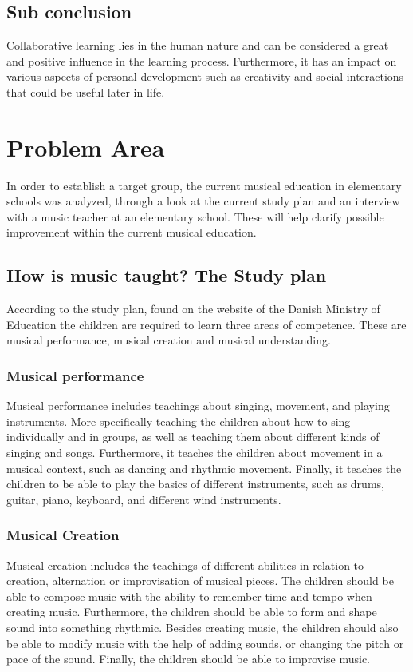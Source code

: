 \subsection*{Sub conclusion}
Collaborative learning lies in the human nature and can be considered a great and positive influence in the learning process. Furthermore, it has an impact on various aspects of personal development such as creativity and social interactions that could be useful later in life.

\newpage \section{Problem Area}\label{sec:problemArea}
In order to establish a target group, the current musical education in elementary schools was analyzed, through a look at the current study plan and an interview with a music teacher at an elementary school. These will help clarify possible improvement within the current musical education.

\subsection{How is music taught? The Study plan}\label{studyPlan}
According to the study plan, found on the website of the Danish Ministry of Education the children are required to learn three areas of competence. These are musical performance, musical creation and musical understanding\cite{studyPlan}.

\subsubsection*{Musical performance}
Musical performance includes teachings about singing, movement, and playing instruments. More specifically teaching the children about how to sing individually and in groups, as well as teaching them about different kinds of singing and songs. Furthermore, it teaches the children about movement in a musical context, such as dancing and rhythmic movement. Finally, it teaches the children to be able to play the basics of different instruments, such as drums, guitar, piano, keyboard, and different wind instruments\cite{studyPlan}.

\subsubsection*{Musical Creation}
Musical creation includes the teachings of different abilities in relation to creation, alternation or improvisation of musical pieces. The children should be able to compose music with the ability to remember time and tempo when creating music. Furthermore, the children should be able to form and shape sound into something rhythmic. Besides creating music, the children should also be able to modify music with the help of adding sounds, or changing the pitch or pace of the sound. Finally, the children should be able to improvise music\cite{studyPlan}.

